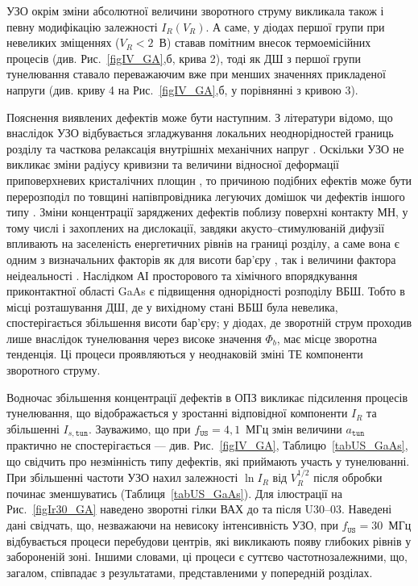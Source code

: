 УЗО окрім зміни абсолютної величини зворотного струму викликала також і певну модифікацію залежності $I_R(V_R)$.
А саме, у діодах першої групи при невеликих зміщеннях ($V_R<2$~В) ставав помітним внесок термоемісійних процесів (див. Рис.~\ref{figIV_GA},б, крива 2),
тоді як ДШ з першої групи тунелювання ставало переважаючим вже при менших значеннях прикладеної напруги (див. криву 4 на Рис.~\ref{figIV_GA},б, у порівнянні з кривою 3).

Пояснення виявлених дефектів може бути наступним.
З літератури  відомо, що внаслідок УЗО відбувається згладжування локальних неоднорідностей границь розділу \cite{Parchinskii2003r} та
часткова релаксація внутрішніх механічних напруг \cite{BritunFTT,Zdeb1989}.
Оскільки УЗО не викликає зміни  радіусу кривизни та величини відносної деформації приповерхневих кристалічних площин \cite{UST:SDErmol},
то причиною подібних ефектів може бути перерозподіл по товщині напівпровідника легуючих домішок \cite{Zaver} чи дефектів іншого типу \cite{Ostrov2002FTPr}.
Зміни концентрації заряджених дефектів поблизу поверхні контакту МН, у тому числі і захоплених на дислокації, завдяки акусто--стимулюваній дифузії впливають на заселеність енергетичних рівнів на границі розділу, а саме вона є одним з визначальних факторів як для висоти бар’єру \cite{Rhoderick1988,Singh1994},
так і величини фактора неідеальності \cite{Ikoma}.
Наслідком АІ просторового та хімічного впорядкування приконтактної області GaAs є підвищення однорідності розподілу ВБШ.
Тобто в місці розташування ДШ, де у вихідному стані ВБШ була невелика, спостерігається збільшення висоти бар'єру;
у діодах, де зворотній струм проходив лише внаслідок тунелювання через високе значення $\Phi_b$, має місце зворотна тенденція.
Ці процеси проявляються у неоднаковій зміні ТЕ компоненти зворотного струму.

Водночас збільшення концентрації дефектів в ОПЗ викликає підсилення процесів тунелювання, що відображається у зростанні відповідної компоненти $I_R$
та збільшенні $I_{s,\mathtt{tun}}$.
Зауважимо, що при $f_\mathtt{US}=4,1$~МГц змін величини $a_\mathtt{tun}$ практично не спостерігається --- див. Рис.~\ref{figIV_GA}, Таблицю~\ref{tabUS_GaAs},
що свідчить про незмінність типу дефектів, які приймають участь у тунелюванні.
При збільшенні частоти УЗО нахил залежності $\ln I_R$ від $V_R^{1/2}$  після обробки починає зменшуватись (Таблиця~\ref{tabUS_GaAs}).
Для ілюстрації на Рис.~\ref{figIr30_GA} наведено зворотні гілки ВАХ до та після U30--03.
Наведені дані свідчать, що, незважаючи на невисоку інтенсивність УЗО, при $f_\mathtt{US}=30$~МГц відбувається процеси перебудови центрів, які викликають появу глибоких рівнів у забороненій зоні.
Іншими словами, ці процеси є суттєво частотнозалежними, що, загалом, співпадає з результатами, представленими у попередній розділах.


